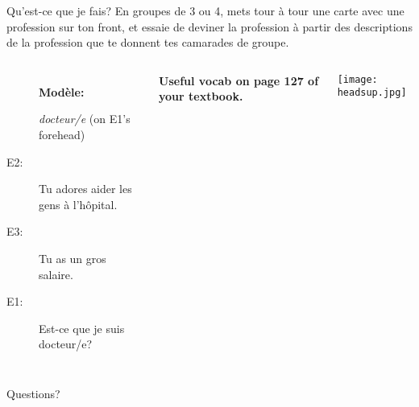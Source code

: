 \documentclass{beamer}
\begin{document}
  \begin{frame}{Qu'est-ce que je fais?}
    En groupes de 3 ou 4, mets tour à tour une carte avec une profession sur ton front, et essaie de deviner la profession à partir des descriptions de la profession que te donnent tes camarades de groupe. \\
    \begin{columns}
        \begin{description}
          \item[] \textbf{Modèle:}
          \item[] \emph{docteur/e} (on E1's forehead)
          \item[E2:] Tu adores aider les gens à l'hôpital.
          \item[] 
          \item[E3:] Tu as un gros salaire.
          \item[] 
          \item[E1:] Est-ce que je suis docteur/e?
          \item[] 
        \end{description}
        \begin{center}
          \scriptsize
          \textbf{Useful vocab on page 127 of your textbook.}
        \end{center}
        \begin{center}
          \texttt{[image: headsup.jpg]}
        \end{center}
    \end{columns}
  \end{frame}

  \begin{frame}{}
    \begin{center}
      \Large Questions?
    \end{center}
  \end{frame}
\end{document}
